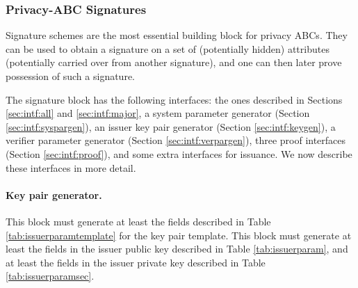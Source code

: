     \subsubsection{Privacy-ABC Signatures}

    Signature schemes are the most essential building block for privacy ABCs.
    They can be used to obtain a signature on a set of (potentially hidden) attributes
    (potentially carried over from another signature),
    and one can then later prove possession of such a signature.

    The signature block has the following interfaces:
    the ones described in Sections \ref{sec:intf:all} and \ref{sec:intf:major},
    a system parameter generator (Section \ref{sec:intf:syspargen}),
    an issuer key pair generator (Section \ref{sec:intf:keygen}),
    a verifier parameter generator (Section \ref{sec:intf:verpargen}),
    three proof interfaces (Section \ref{sec:intf:proof}),
    and some extra interfaces for issuance.
    We now describe these interfaces in more detail.

    \paragraph{Key pair generator.}
    This block must generate at least the fields described in Table \ref{tab:issuerparamtemplate} for the key pair
    template.
    This block must generate at least the fields in the issuer public key described in Table \ref{tab:issuerparam},
    and at least the fields in the issuer private key described in Table \ref{tab:issuerparamsec}.

